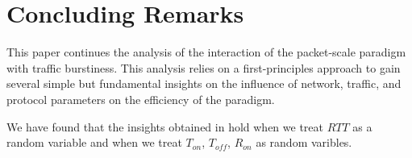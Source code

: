 \section{Concluding Remarks}
  This paper continues the analysis of the interaction of the packet-scale 
  paradigm with traffic burstiness. This analysis relies on a first-principles 
  approach to gain several simple but fundamental insights on the influence of 
  network, traffic, and protocol parameters on the efficiency of the paradigm.

  We have found that the insights obtained in \cite{Lovewell2011-Noise-TR} 
  hold when we treat $RTT$ as a random variable and when we treat $T_{on}$, 
  $T_{off}$, $R_{on}$ as random varibles. 
